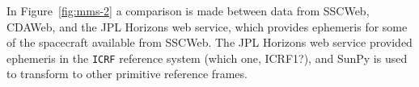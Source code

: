 \documentclass[draft]{agujournal2019}
\begin{document}

In Figure~\ref{fig:mms-2} a comparison is made between data from SSCWeb, CDAWeb, and the JPL Horizons web service, which provides ephemeris for some of the spacecraft available from SSCWeb. The JPL Horizons web service provided ephemeris in the \texttt{ICRF} reference system (which one, ICRF1?), and SunPy is used to transform to other primitive reference frames.

\end{document}
